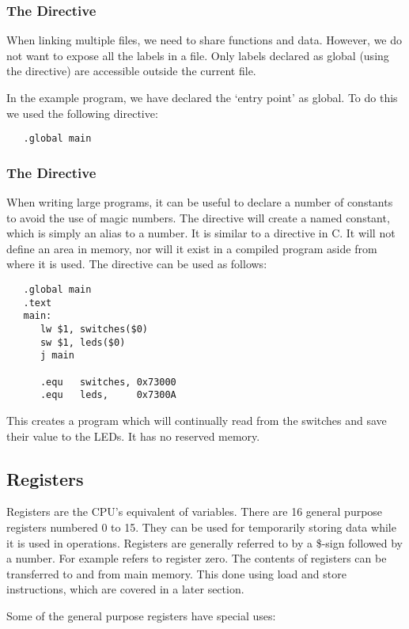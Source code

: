 \subsubsection{The \Global Directive}
When linking multiple files, we need to share functions and data.
However, we do not want to expose all the labels in a file.
Only labels declared as global (using the \Global directive) are
accessible outside the current file.

In the example program, we have declared the `entry point' 
as global. To do this we used the following directive:
\begin{verbatim}
   .global main
\end{verbatim}

\subsubsection{The \equ Directive}
When writing large programs, it can be useful to declare a number of
constants to avoid the use of magic numbers. The \equ directive will
create a named constant, which is simply an alias to a number. It is
similar to a  directive in C. It will not define an
area in memory, nor will it exist in a compiled program aside from
where it is used. The directive can be used as follows:

\begin{verbatim}
   .global main
   .text
   main:
      lw $1, switches($0)
      sw $1, leds($0)
      j main

      .equ   switches, 0x73000
      .equ   leds,     0x7300A
\end{verbatim}

This creates a program which will continually read from the switches
and save their value to the LEDs. It has no reserved memory.

\subsection{Registers}
Registers are the CPU's equivalent of variables. There are 16 general
purpose registers numbered 0 to 15. They can be used for temporarily
storing data while it is used in operations. Registers are generally
referred to by a \$-sign followed by a number. For example 
refers to register zero. The contents of registers can be transferred
to and from main memory. This done using load and store instructions,
which are covered in a later section.

Some of the general purpose registers have special uses:

